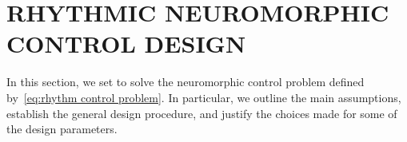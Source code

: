 \documentclass{article}
\newcommand{\RR}{\mathbb{R}}
\newcommand{\rd}{\mathrm{d}}
\newcommand{\AF}[1]{{\color{orange}#1}}
\theoremstyle{definition}
\theoremstyle{remark}
\begin{document}






\section{RHYTHMIC NEUROMORPHIC CONTROL DESIGN}

In this section, we set to solve the neuromorphic control problem defined by~\eqref{eq:rhythm control problem}. In particular, we outline the main assumptions, establish the general design procedure, and justify the choices made for some of the design parameters.

\end{document}
